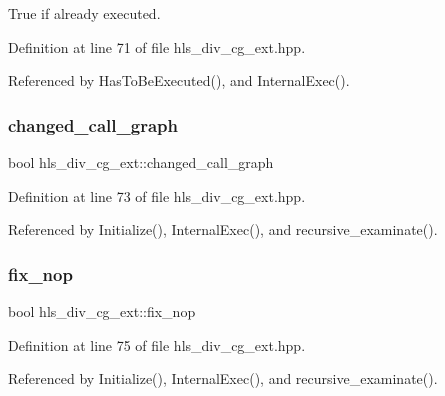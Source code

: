 True if already executed. 



Definition at line 71 of file hls\+\_\+div\+\_\+cg\+\_\+ext.\+hpp.



Referenced by Has\+To\+Be\+Executed(), and Internal\+Exec().

\mbox{\label{classhls__div__cg__ext_a1e647b82d330ae037ab097f99487598f}} 
\subsubsection{\texorpdfstring{changed\+\_\+call\+\_\+graph}{changed\_call\_graph}}
{\footnotesize\ttfamily bool hls\+\_\+div\+\_\+cg\+\_\+ext\+::changed\+\_\+call\+\_\+graph\hspace{0.3cm}{\ttfamily [protected]}}



Definition at line 73 of file hls\+\_\+div\+\_\+cg\+\_\+ext.\+hpp.



Referenced by Initialize(), Internal\+Exec(), and recursive\+\_\+examinate().

\mbox{\label{classhls__div__cg__ext_a820f01674be00cafce2706348a0c7bcd}} 
\subsubsection{\texorpdfstring{fix\+\_\+nop}{fix\_nop}}
{\footnotesize\ttfamily bool hls\+\_\+div\+\_\+cg\+\_\+ext\+::fix\+\_\+nop\hspace{0.3cm}{\ttfamily [protected]}}



Definition at line 75 of file hls\+\_\+div\+\_\+cg\+\_\+ext.\+hpp.



Referenced by Initialize(), Internal\+Exec(), and recursive\+\_\+examinate().

\mbox{\label{classhls__div__cg__ext_a323afb4153ecbeaf3f1808824702e815}} 
